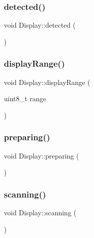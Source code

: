 \subsubsection{\texorpdfstring{detected()}{detected()}}
{\footnotesize\ttfamily void Display\+::detected (\begin{DoxyParamCaption}{ }\end{DoxyParamCaption})}

\mbox{\label{class_display_a17b2c33591506754e00487cf24e82e8d}} 
\subsubsection{\texorpdfstring{display\+Range()}{displayRange()}}
{\footnotesize\ttfamily void Display\+::display\+Range (\begin{DoxyParamCaption}\item[{uint8\+\_\+t}]{range }\end{DoxyParamCaption})}

\mbox{\label{class_display_afe748da9597c76a9e1e2cf663b7c9b9e}} 
\subsubsection{\texorpdfstring{preparing()}{preparing()}}
{\footnotesize\ttfamily void Display\+::preparing (\begin{DoxyParamCaption}{ }\end{DoxyParamCaption})}

\mbox{\label{class_display_ae078e2aed9366db1ec8c8835d80a39ac}} 
\subsubsection{\texorpdfstring{scanning()}{scanning()}}
{\footnotesize\ttfamily void Display\+::scanning (\begin{DoxyParamCaption}{ }\end{DoxyParamCaption})}

\mbox{\label{class_display_ab36a436c95c76efa0ad1bd023e92ec48}} 
